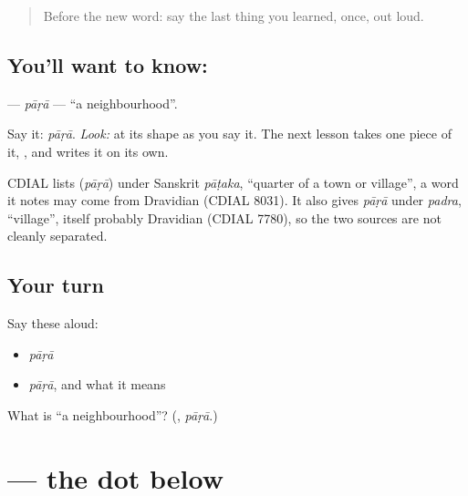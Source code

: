 \label{lesson:BN-C10-para}



\begin{quote}
Before the new word: say the last thing you learned, once, out loud.
\end{quote}

\subsection*{You'll want to know: }
\textbf{} — \emph{pāṛā} — \textquotedblleft{}a neighbourhood\textquotedblright{}.

Say it: \emph{pāṛā}. \emph{Look:} at its shape as you say it. The next lesson takes one piece of it, \textbf{}, and writes it on its own.

\begin{cousinweb}
CDIAL lists \textbf{} (\emph{pāṛā}) under Sanskrit \emph{pāṭaka}, \textquotedblleft{}quarter of a town or village\textquotedblright{}, a word it notes may come from Dravidian (CDIAL 8031). It also gives \emph{pāṛā} under \emph{padra}, \textquotedblleft{}village\textquotedblright{}, itself probably Dravidian (CDIAL 7780), so the two sources are not cleanly separated.
\end{cousinweb}

\subsection*{Your turn}
Say these aloud:

\begin{itemize}
\raggedright
  \item \emph{pāṛā}
  \item \emph{pāṛā}, and what it means
\end{itemize}

\begin{tcolorbox}[breakable,colback=teal!4,colframe=teal!35!black,title={Before you move on}]
What is \textquotedblleft{}a neighbourhood\textquotedblright{}? (\textbf{}, \emph{pāṛā}.)
\end{tcolorbox}
\section[\texorpdfstring{\bn{়} ((the dot below))}{় ((the dot below))}]{ — the dot below}

\label{lesson:BN-W04-nukta}




